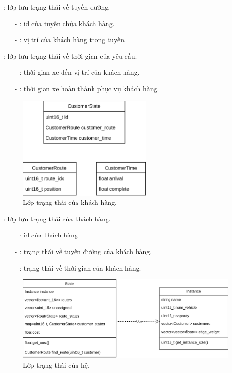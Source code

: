 : lớp lưu trạng thái về tuyến đường.
\begin{itemize}
	\item[-] : id của tuyến chứa khách hàng.
	\item[-] : vị trí của khách hàng trong tuyến.
\end{itemize}

: lớp lưu trạng thái về thời gian của yêu cầu.
\begin{itemize}
	\item[-] : thời gian xe đến vị trí của khách hàng.
	\item[-] : thời gian xe hoàn thành phục vụ khách hàng.
\end{itemize}

\begin{figure}[H] %
	\centering %
	\includegraphics[width=0.6\textwidth]{figures/CustomerState.png}
	\caption{Lớp trạng thái của khách hàng.}
	\label{fig:fg_03}
\end{figure}

: lớp lưu trạng thái của khách hàng.
\begin{itemize}
	\item[-] : id của khách hàng.
	\item[-] : trạng thái về tuyến đường của khách hàng.
	\item[-] : trạng thái về thời gian của khách hàng.
\end{itemize}

\begin{figure}[H] %
	\centering %
	\includegraphics[width=1\textwidth]{figures/core-object.png}
	\caption{Lớp trạng thái của hệ.}
	\label{fig:fg_04}
\end{figure}


